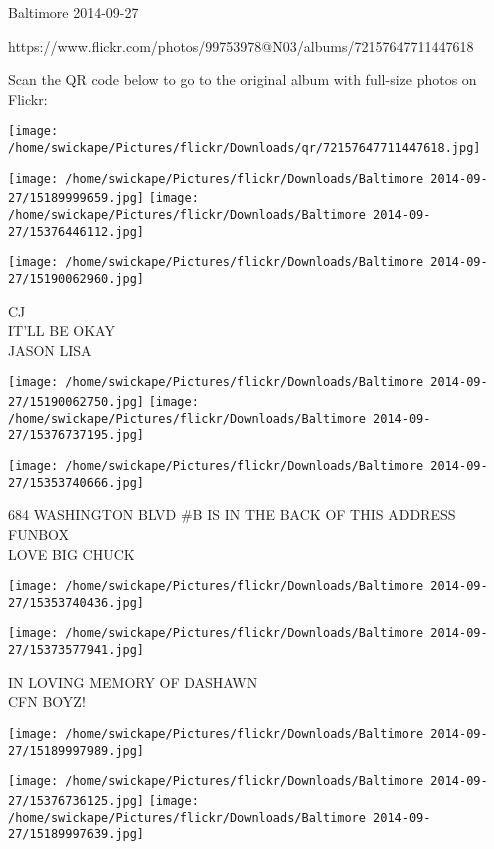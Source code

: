 \documentclass[10pt,letterpaper]{article}
\begin{document}
Baltimore 2014-09-27

https://www.flickr.com/photos/99753978@N03/albums/72157647711447618

Scan the QR code below to go to the original album with full-size photos on Flickr:

\texttt{[image: /home/swickape/Pictures/flickr/Downloads/qr/72157647711447618.jpg]}
\pagebreak

\texttt{[image: /home/swickape/Pictures/flickr/Downloads/Baltimore 2014-09-27/15189999659.jpg]}
\texttt{[image: /home/swickape/Pictures/flickr/Downloads/Baltimore 2014-09-27/15376446112.jpg]}

\vspace{0.25in}
\texttt{[image: /home/swickape/Pictures/flickr/Downloads/Baltimore 2014-09-27/15190062960.jpg]}

CJ\\
IT'LL BE OKAY\\
JASON LISA
\pagebreak

\texttt{[image: /home/swickape/Pictures/flickr/Downloads/Baltimore 2014-09-27/15190062750.jpg]}
\texttt{[image: /home/swickape/Pictures/flickr/Downloads/Baltimore 2014-09-27/15376737195.jpg]}

\vspace{0.25in}
\texttt{[image: /home/swickape/Pictures/flickr/Downloads/Baltimore 2014-09-27/15353740666.jpg]}

684 WASHINGTON BLVD \#B IS IN THE BACK OF THIS ADDRESS\\
FUNBOX\\
LOVE BIG CHUCK
\pagebreak

\texttt{[image: /home/swickape/Pictures/flickr/Downloads/Baltimore 2014-09-27/15353740436.jpg]}

\vspace{0.25in}
\texttt{[image: /home/swickape/Pictures/flickr/Downloads/Baltimore 2014-09-27/15373577941.jpg]}

IN LOVING MEMORY OF DASHAWN\\
CFN BOYZ!
\pagebreak

\texttt{[image: /home/swickape/Pictures/flickr/Downloads/Baltimore 2014-09-27/15189997989.jpg]}

\vspace{0.25in}
\texttt{[image: /home/swickape/Pictures/flickr/Downloads/Baltimore 2014-09-27/15376736125.jpg]}
\texttt{[image: /home/swickape/Pictures/flickr/Downloads/Baltimore 2014-09-27/15189997639.jpg]}
\end{document}
